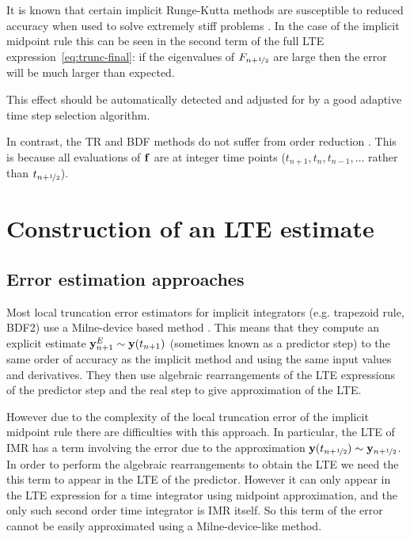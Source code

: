 It is known that certain implicit Runge-Kutta methods are susceptible to reduced accuracy when used to solve extremely stiff problems \cite[pg. 156]{Atkinson1994}.
In the case of the implicit midpoint rule this can be seen in the second term of the full LTE expression~\eqref{eq:trunc-final}: if the eigenvalues of $F_{n+\nicefrac{1}{2}}$ are large then the error will be much larger than expected.

This effect should be automatically detected and adjusted for by a good adaptive time step selection algorithm.

In contrast, the TR and BDF methods do not suffer from order reduction \cite[pg. 159]{Atkinson1994}.
This is because all evaluations of ${\mathbf{f}}$ are at integer time points (\ie $t_{n+1}, t_{n}, t_{n-1}, \ldots$ rather than $t_{n+\nicefrac{1}{2}}$).




\section{Construction of an LTE estimate}

\subsection{Error estimation approaches}
\label{sec:two-integrator-error}

Most local truncation error estimators for implicit integrators (e.g. trapezoid rule, BDF2) use a Milne-device based method \cite[707-716]{GreshoSani}.
This means that they compute an explicit estimate $\mathbf{y}^E_{n+1} \sim \mathbf{y}(t_{n+1})$  (sometimes known as a predictor step) to the same order of accuracy as the implicit method and using the same input values and derivatives.
They then use algebraic rearrangements of the LTE expressions of the predictor step and the real step to give approximation of the LTE.

However due to the complexity of the local truncation error of the implicit midpoint rule there are difficulties with this approach.
In particular, the LTE of IMR has a term involving the error due to the approximation $\mathbf{y}(t_{n+\nicefrac{1}{2}}) \sim \mathbf{y}_{n+\nicefrac{1}{2}}$.
In order to perform the algebraic rearrangements to obtain the LTE we need the this term to appear in the LTE of the predictor.
However it can only appear in the LTE expression for a time integrator using midpoint approximation, and the only such second order time integrator is IMR itself.
So this term of the error cannot be easily approximated using a Milne-device-like method.


